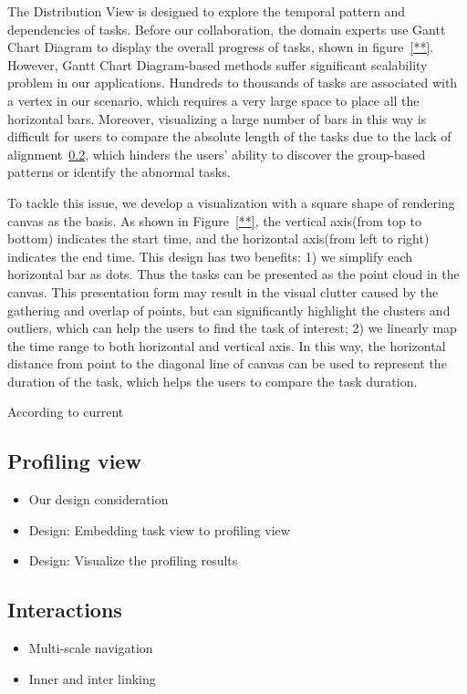 The Distribution View is designed to explore the temporal pattern and dependencies of tasks.
Before our collaboration, the domain experts use Gantt Chart Diagram to display the overall progress of tasks, shown in figure~\ref{**}. 
However, Gantt Chart Diagram-based methods suffer significant scalability problem in our applications. Hundreds to thousands of tasks are associated with a vertex in our scenario, which requires a very large space to place all the horizontal bars. 
Moreover, visualizing a large number of bars in this way is difficult for users to compare the absolute length of the tasks due to the lack of alignment~\ref{}, which hinders the users' ability to discover the group-based patterns or identify the abnormal tasks. 

To tackle this issue, we develop a visualization with a square shape of rendering canvas as the basis. As shown in Figure~\ref{**}, the vertical axis(from top to bottom) indicates the start time, and the horizontal axis(from left to right) indicates the end time. This design has two benefits: 1) we simplify each horizontal bar as dots. Thus the tasks can be presented as the point cloud in the canvas. This presentation form may result in the visual clutter caused by the gathering and overlap of points, but can significantly highlight the clusters and outliers, which can help the users to find the task of interest; 2) we linearly map the time range to both horizontal and vertical axis. In this way, the horizontal distance from point to the diagonal line of canvas can be used to represent the duration of the task, which helps the users to compare the task duration. 

According to current 


\subsection{Profiling view}
\begin{itemize}
    \item Our design consideration
    \item Design: Embedding task view to profiling view
    \item Design: Visualize the profiling results
\end{itemize}

\subsection{Interactions}
\begin{itemize}
    \item Multi-scale navigation
    \item Inner and inter linking
\end{itemize}
